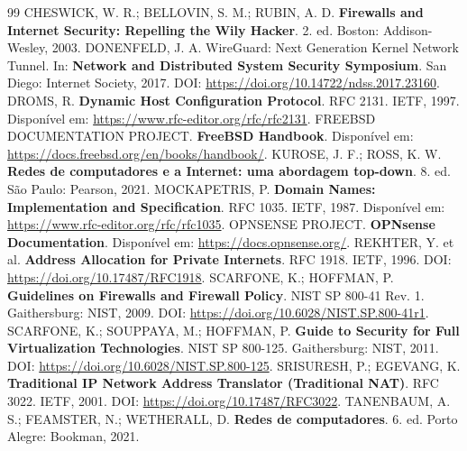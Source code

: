 \documentclass[12pt,a4paper]{article}
\begin{document}
\newpage\renewcommand{\refname}{Referências}
\begin{thebibliography}{99}
CHESWICK, W. R.; BELLOVIN, S. M.; RUBIN, A. D. \textbf{Firewalls and Internet Security: Repelling the Wily Hacker}. 2. ed. Boston: Addison-Wesley, 2003.
DONENFELD, J. A. WireGuard: Next Generation Kernel Network Tunnel. In: \textbf{Network and Distributed System Security Symposium}. San Diego: Internet Society, 2017. DOI: \url{https://doi.org/10.14722/ndss.2017.23160}.
DROMS, R. \textbf{Dynamic Host Configuration Protocol}. RFC 2131. IETF, 1997. Disponível em: \url{https://www.rfc-editor.org/rfc/rfc2131}.
FREEBSD DOCUMENTATION PROJECT. \textbf{FreeBSD Handbook}. Disponível em: \url{https://docs.freebsd.org/en/books/handbook/}.
KUROSE, J. F.; ROSS, K. W. \textbf{Redes de computadores e a Internet: uma abordagem top-down}. 8. ed. São Paulo: Pearson, 2021.
MOCKAPETRIS, P. \textbf{Domain Names: Implementation and Specification}. RFC 1035. IETF, 1987. Disponível em: \url{https://www.rfc-editor.org/rfc/rfc1035}.
OPNSENSE PROJECT. \textbf{OPNsense Documentation}. Disponível em: \url{https://docs.opnsense.org/}.
REKHTER, Y. et al. \textbf{Address Allocation for Private Internets}. RFC 1918. IETF, 1996. DOI: \url{https://doi.org/10.17487/RFC1918}.
SCARFONE, K.; HOFFMAN, P. \textbf{Guidelines on Firewalls and Firewall Policy}. NIST SP 800-41 Rev. 1. Gaithersburg: NIST, 2009. DOI: \url{https://doi.org/10.6028/NIST.SP.800-41r1}.
SCARFONE, K.; SOUPPAYA, M.; HOFFMAN, P. \textbf{Guide to Security for Full Virtualization Technologies}. NIST SP 800-125. Gaithersburg: NIST, 2011. DOI: \url{https://doi.org/10.6028/NIST.SP.800-125}.
SRISURESH, P.; EGEVANG, K. \textbf{Traditional IP Network Address Translator (Traditional NAT)}. RFC 3022. IETF, 2001. DOI: \url{https://doi.org/10.17487/RFC3022}.
TANENBAUM, A. S.; FEAMSTER, N.; WETHERALL, D. \textbf{Redes de computadores}. 6. ed. Porto Alegre: Bookman, 2021.
\end{thebibliography}
\end{document}
